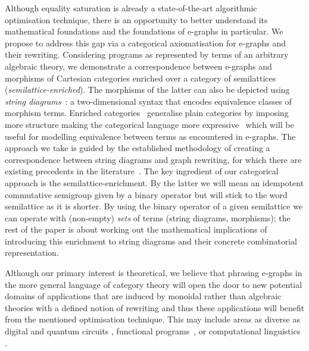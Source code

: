 Although equality saturation is already a state-of-the-art algorithmic optimisation technique, there is an opportunity to better understand its mathematical foundations and the foundations of e-graphs in particular.
We propose to address this gap via a categorical axiomatisation for e-graphs and their rewriting.
Considering programs as represented by terms of an arbitrary algebraic theory, we demonstrate a correspondence between e-graphs and morphisms of Cartesian categories enriched over a category of semilattices (\textit{semilattice-enriched}).
The morphisms of the latter can also be depicted using \emph{string diagrams}~\cite{Selinger_2010,joyal_geometry_1991, mellies_functorial_2006}: a two-dimensional syntax that encodes equivalence classes of morphism terms.
Enriched categories~\cite{Borceux_1994,Kelly2022BASICCO} generalise plain categories by imposing more structure making the categorical language more expressive~\cite{Borceux_1994,Kelly2022BASICCO} which will be useful for modelling equivalence between terms as encountered in e-graphs.
The approach we take is guided by the established methodology of creating a correspondence between string diagrams and graph rewriting, for which there are existing precedents in the literature~\cite{bonchi_string_2022-1,bonchi_string_2022-2,bonchi_string_2022-3,fscd,ghica-zanassi2023string}.
The key ingredient of our categorical approach is the semilattice-enrichment.
By the latter we will mean an idempotent commutative semigroup given by a binary operator but will stick to the word semilattice as it is shorter.
By using the binary operator of a given semilattice we can operate with (non-empty) \textit{sets} of terms (string diagrams, morphisms); the rest of the paper is about working out the mathematical implications of introducing this enrichment to string diagrams and their concrete combinatorial representation.

Although our primary interest is theoretical, we believe that phrasing e-graphs in the more general language of category theory will open the door to new potential domains of applications that are induced by monoidal rather than algebraic theories with a defined notion of rewriting and thus these applications will benefit from the mentioned optimisation technique.
This may include areas as diverse as digital \cite{ghica_compositional_2023} and quantum circuits
\cite{coecke_interacting_2011,ZX}, functional programs~\cite{ghica-zanassi2023string}, or computational linguistics \cite{wazni_quantum_2022,coecke_lambek_2013}.

